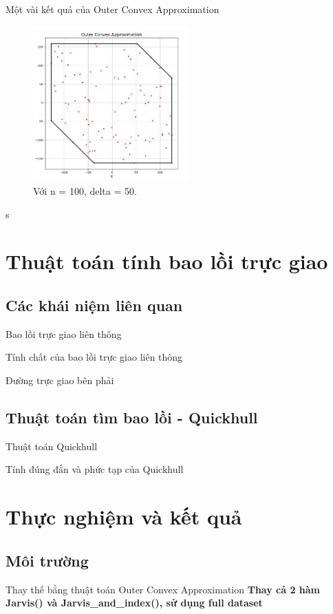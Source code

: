 \documentclass[11pt]{beamer}
\theoremstyle{definition}
\theoremstyle{plain}
\theoremstyle{plain}
\theoremstyle{remark}
\begin{document}
\begin{frame}{Một vài kết quả của Outer Convex Approximation}
	\begin{figure}
		\begin{center}
			\includegraphics[width=6cm]{./result_outer_cv_delta50.jpg}
			\caption{Với n = 100, delta = 50.}
			\label{result_outer_cv_delta50}
		\end{center}
	\end{figure}
	s
\end{frame}
\section{Thuật toán tính bao lồi trực giao}
\subsection{Các khái niệm liên quan}
\begin{frame}{Bao lồi trực giao liên thông}
	
\end{frame}
\begin{frame}{Tính chất của bao lồi trực giao liên thông}
	
\end{frame}
\begin{frame}{Đường trực giao bên phải}
	
\end{frame}

\subsection{Thuật toán tìm bao lồi - Quickhull}
\begin{frame}{ Thuật toán Quickhull}
	
\end{frame}
\begin{frame}{Tính đúng đắn và phức tạp của Quickhull}

\end{frame}
\section{Thực nghiệm và kết quả}
\subsection{Môi trường}
\begin{frame}{Thay thế bằng thuật toán Outer Convex Approximation}
	\textbf{Thay cả 2 hàm Jarvis() và Jarvis\_and\_index(), sử dụng full dataset}
\end{frame}
\end{document}

